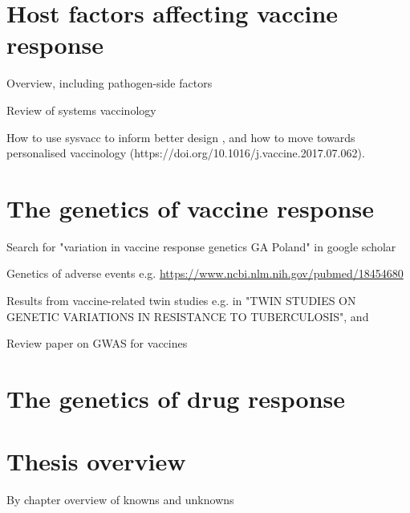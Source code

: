 \section{Host factors affecting vaccine response}

Overview, including pathogen-side factors

\autocite{}

Review of systems vaccinology

How to use sysvacc to inform better design \autocite{Mooney2013a}, and how to move towards personalised vaccinology (https://doi.org/10.1016/j.vaccine.2017.07.062).

\section{The genetics of vaccine response}

Search for "variation in vaccine response genetics GA Poland" in google scholar

Genetics of adverse events e.g. \url{https://www.ncbi.nlm.nih.gov/pubmed/18454680}

Results from vaccine-related twin studies e.g. in "TWIN STUDIES ON GENETIC VARIATIONS IN RESISTANCE TO TUBERCULOSIS", and \autocite{Qi2016} 

\autocite{}


Review paper on GWAS for vaccines \autocite{Mooney2013}

\section{The genetics of drug response}

\section{Thesis overview}

By chapter overview of knowns and unknowns


